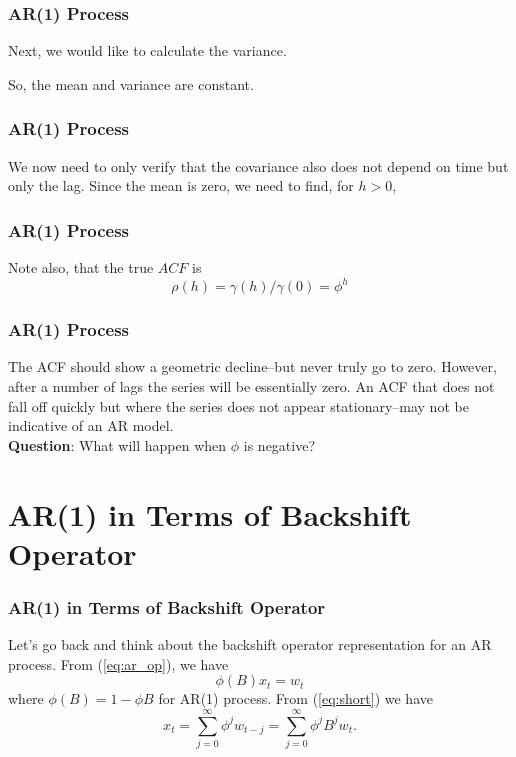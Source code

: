 \documentclass[%
xcolor=pdftex]{beamer}
\begin{document}
\begin{frame}
\frametitle{AR(1) Process}

Next, we would like to calculate the variance.

\vspace{50mm}

So, the mean and variance are constant.


\end{frame}

\begin{frame}
\frametitle{AR(1) Process}

We now need to only
verify that the covariance also does not depend on time but
only the lag. Since the mean is zero, we need to find, for
$h > 0$,

\vspace{50mm}

\end{frame}

\begin{frame}
\frametitle{AR(1) Process}

Note also, that the true $ACF$ is
$$
\rho(h)=\gamma(h)/\gamma(0)=\phi^h
$$


\end{frame}

\begin{frame}
\frametitle{AR(1) Process}

The ACF should show a geometric decline--but never truly go to zero.  However, after a number of lags the series will be essentially zero.  An ACF that does not fall off quickly but where the series does not appear stationary--may not be indicative of an AR model.  \\
\vspace{5mm}
\textbf{Question}: What will happen when $\phi$ is negative?


\end{frame}

\section{AR(1) in Terms of Backshift Operator}
\frame{\tableofcontents[currentsection]}


\begin{frame}
\frametitle{AR(1) in Terms of Backshift Operator}

Let's go back and think about the backshift operator representation for an AR process.  From (\ref{eq:ar_op}), we have
 $$
 \phi(B) x_t=w_t
 $$
 where $\phi(B)=1-\phi B$ for AR(1) process. From (\ref{eq:short}) we have
$$
x_t=\sum_{j=0}^{\infty} \phi^j w_{t-j} = \sum_{j=0}^{\infty} \phi^j B^j w_t.
$$

\end{frame}
\end{document}
